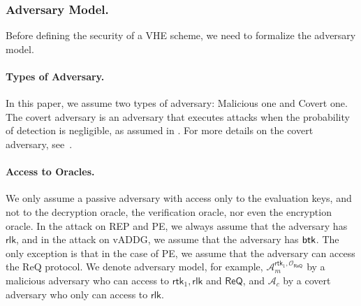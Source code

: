 \documentclass[runningheads]{llncs}
\newcommand{\cc}[1]{\mathcal{#1}} %
\newcommand{\rlk}{\textsf{rlk}{}}
\newcommand{\rtk}{\textsf{rtk}{}}
\newcommand{\REP}{\textsf{REP}{}}
\newcommand{\PE}{\textsf{PE}{}}
\newcommand{\REQ}{\textsf{ReQ}}
\begin{document}
        \subsubsection{Adversary Model.} 
        Before defining the security of a VHE scheme, we need to formalize the adversary model. 
        
        \paragraph{Types of Adversary.} In this paper, we assume two types of adversary: Malicious one and Covert one. The covert adversary is an adversary that executes attacks when the probability of detection is negligible, as assumed in \cite{VE}. For more details on the covert adversary, see~\cite{Covert}.
        
        \paragraph{Access to Oracles.} We only assume a passive adversary with access only to the evaluation keys, and not to the decryption oracle, the verification oracle, nor even the encryption oracle. In the attack on \REP{} and \PE{}, we always assume that the adversary has $\rlk$, and in the attack on vADDG, we assume that the adversary has $\sf btk$. The only exception is that in the case of \PE{}, we assume that the adversary can access the \REQ{} protocol.
        We denote adversary model, for example, $\cc A_m^{\rtk_1,\cc O_{\REQ}}$ by a malicious adversary who can access to $\rtk_1, \rlk$ and $\REQ$, and $\cc A_c$ by a covert adversary who only can access to $\rlk.$
        
\end{document}

